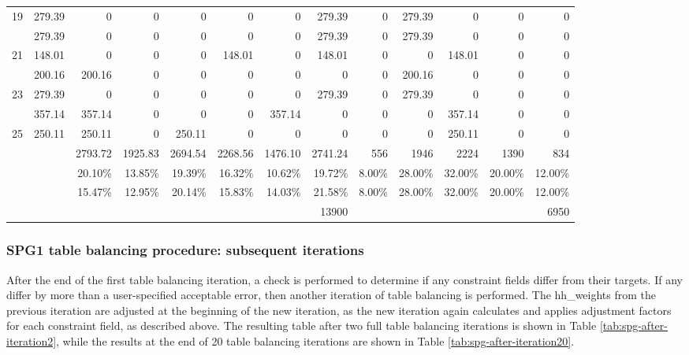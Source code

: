 \begin{sidewaystable}
\begin{tabular}{c*{12}{r}}
19 & 279.39 & 0 & 0 & 0 & 0 & 0 & 279.39 & 0 & 279.39 & 0 & 0 & 0 \\
\gray 20 & 279.39 & 0 & 0 & 0 & 0 & 0 & 279.39 & 0 & 279.39 & 0 & 0 & 0 \\
21 & 148.01 & 0 & 0 & 0 & 148.01 & 0 & 148.01 & 0 & 0 & 148.01 & 0 & 0 \\
\gray 22 & 200.16 & 200.16 & 0 & 0 & 0 & 0 & 0 & 0 & 200.16 & 0 & 0 & 0 \\
23 & 279.39 & 0 & 0 & 0 & 0 & 0 & 279.39 & 0 & 279.39 & 0 & 0 & 0 \\
\gray 24 & 357.14 & 357.14 & 0 & 0 & 0 & 357.14 & 0 & 0 & 0 & 357.14 & 0 & 0 \\
25 & 250.11 & 250.11 & 0 & 250.11 & 0 & 0 & 0 & 0 & 0 & 250.11 & 0 & 0 \\
\hline
 & & 2793.72 & 1925.83 & 2694.54 & 2268.56 & 1476.10 & 2741.24 & 556 & 1946 & 2224 & 1390 & 834 \\
 & & 20.10\% & 13.85\% & 19.39\% & 16.32\% & 10.62\% & 19.72\% & 8.00\% & 28.00\% & 32.00\% & 20.00\% & 12.00\% \\
\rowcolor{yellow!10} \cellcolor{white} & \cellcolor{white} & 15.47\% & 12.95\% & 20.14\% & 15.83\% & 14.03\% & 21.58\% & 8.00\% & 28.00\% & 32.00\% & 20.00\% & 12.00\% \\
 &  &  &  &  &  &  & 13900 &  &  &  &  & 6950 \\
\hline
\end{tabular}
\end{sidewaystable}

\subsubsection{SPG1 table balancing procedure: subsequent iterations}
After the end of the first table balancing iteration, a check is performed to determine if any constraint fields differ from their targets. If any differ by more than a user-specified acceptable error, then another iteration of table balancing is performed. The hh\_weights from the previous iteration are adjusted at the beginning of the new iteration, as the new iteration again calculates and applies adjustment factors for each constraint field, as described above. The resulting table after two full table balancing iterations is shown in Table \ref{tab:spg-after-iteration2}, while the results at the end of 20 table balancing iterations are shown in Table \ref{tab:spg-after-iteration20}. 

